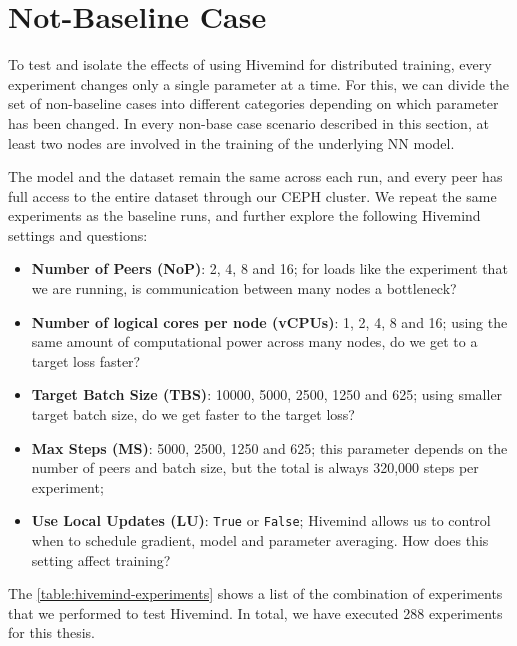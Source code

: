 \section{Not-Baseline Case}

To test and isolate the effects of using Hivemind for distributed training, every experiment changes only a single parameter at a time.
For this, we can divide the set of non-baseline cases into different categories depending on which parameter has been changed.
In every non-base case scenario described in this section, at least two nodes are involved in the training of the underlying NN model.

The model and the dataset remain the same across each run, and every peer has full access to the entire dataset through our CEPH cluster.
We repeat the same experiments as the baseline runs, and further explore the following Hivemind settings and questions:
\begin{itemize}
    \item \textbf{Number of Peers (NoP)}: 2, 4, 8 and 16; for loads like the experiment that we are running, is communication between many nodes a bottleneck?
    \item \textbf{Number of logical cores per node (vCPUs)}: 1, 2, 4, 8 and 16; using the same amount of computational power across many nodes, do we get to a target loss faster?
    \item \textbf{Target Batch Size (TBS)}: 10000, 5000, 2500, 1250 and 625; using smaller target batch size, do we get faster to the target loss?
    \item \textbf{Max Steps (MS)}: 5000, 2500, 1250 and 625; this parameter depends on the number of peers and batch size, but the total is always 320,000 steps per experiment;
    \item \textbf{Use Local Updates (LU)}: \texttt{True} or \texttt{False}; Hivemind allows us to control when to schedule gradient, model and parameter averaging. How does this setting affect training?
\end{itemize}

The \autoref{table:hivemind-experiments} shows a list of the combination of experiments that we performed to test Hivemind.
In total, we have executed 288 experiments for this thesis.

